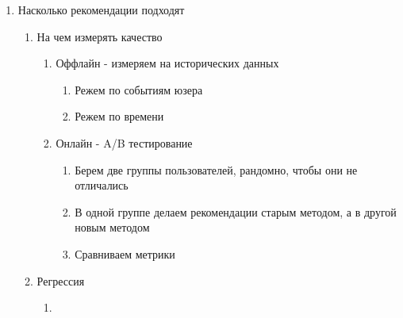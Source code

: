 \documentclass[a4paper, 12pt]{article}
\begin{document}
\begin{enumerate}
\def\labelenumi{\arabic{enumi}.}
\item
  
  Насколько рекомендации подходят
  

  \begin{enumerate}
  \def\labelenumii{\alph{enumii}.}
  \item
    
    На чем измерять качество
    

    \begin{enumerate}
    \def\labelenumiii{\roman{enumiii}.}
    \item
      
      Оффлайн - измеряем на исторических данных
      

      \begin{enumerate}
      \def\labelenumiv{\arabic{enumiv}.}
      \item
        
        Режем по событиям юзера
        
      \item
        
        Режем по времени
        
      \end{enumerate}
    \item
      
      Онлайн - A/B тестирование
      

      \begin{enumerate}
      \def\labelenumiv{\arabic{enumiv}.}
      \item
        
        Берем две группы пользователей, рандомно, чтобы они не
        отличались
        
      \item
        
        В одной группе делаем рекомендации старым методом, а в другой
        новым методом
        
      \item
        
        Сравниваем метрики
        
      \end{enumerate}
    \end{enumerate}
  \item
    
    Регрессия
    

    \begin{enumerate}
    \def\labelenumiii{\roman{enumiii}.}
    \item
      

\end{enumerate}
\end{enumerate}
\end{enumerate}
\end{document}
